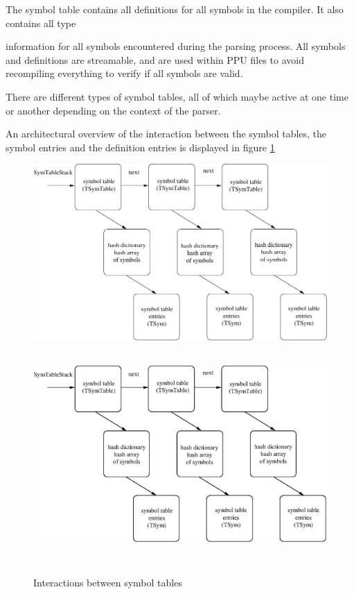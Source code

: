 \documentclass [a4paper,12pt]{article}
\begin{document}
The symbol table contains all definitions for all symbols in the compiler.
It also contains all type

\noindent
information for all symbols encountered during the parsing process. All
symbols and definitions are streamable, and are used within PPU files to
avoid recompiling everything to verify if all symbols are valid.

There are different types of symbol tables, all of which maybe active at one
time or another depending on the context of the parser.

An architectural overview of the interaction between the symbol tables, the
symbol entries and the definition entries is displayed in figure \ref{fig4}

\begin{figure}
\ifpdf
\includegraphics{arch4.pdf}
\else
\includegraphics[width=6.29in,height=3.29in]{arch4.eps}
\fi
\label{fig4}
\caption{Interactions between symbol tables}
\end{figure}
\end{document}
